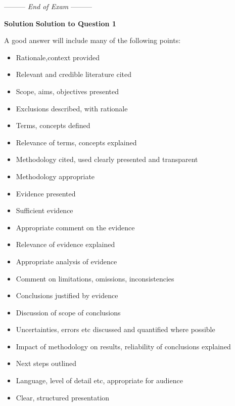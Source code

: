 \documentclass[a4paper,12pt,fleqn]{article}
\newcommand{\lastwords}{End of Exam}
\begin{document}
\begin{center}
\vspace{3cm}
--------- \textit{\lastwords} ---------
\end{center}


\label{finalpage}


\newpage
\textbf{\large{Solution}}\newline\newline
\textbf{Solution to Question 1}\newline

A good answer will include many of the following points:
\begin{itemize}
\item Rationale,context provided
\item Relevant and credible literature cited
\item Scope, aims, objectives presented
\item Exclusions described, with rationale
\item Terms, concepts defined
\item Relevance of terms, concepts explained
\item Methodology cited, used clearly presented and transparent
\item Methodology appropriate
\item Evidence presented
\item Sufficient evidence
\item Appropriate comment on the evidence
\item Relevance of evidence explained
\item Appropriate analysis of evidence
\item Comment on limitations, omissions, inconsistencies
\item Conclusions justified by evidence
\item Discussion of scope of conclusions
\item Uncertainties, errors etc discussed and quantified where possible
\item Impact of methodology on results, reliability of conclusions explained
\item Next steps outlined
\item Language, level of detail etc, appropriate for audience
\item Clear, structured presentation
\end{itemize}
\end{document}
